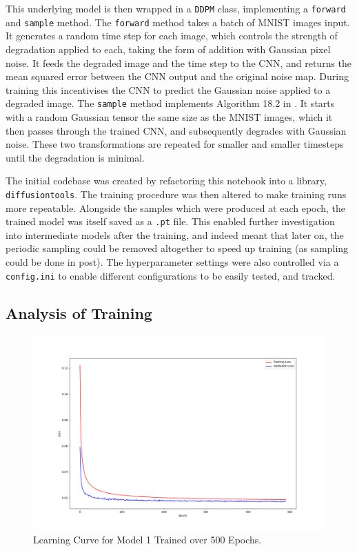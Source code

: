 \documentclass[12pt]{article}
\begin{document}
This underlying model is then wrapped in a \texttt{DDPM} class, implementing a \texttt{forward} and \texttt{sample} method.
The \texttt{forward} method takes a batch of MNIST images input.
It generates a random time step for each image, which controls the strength of degradation applied to each,
taking the form of addition with Gaussian pixel noise.
It feeds the degraded image and the time step to the CNN, and returns the mean squared error between the CNN output and the original noise map.
During training this incentivises the CNN to predict the Gaussian noise applied to a degraded image.
The \texttt{sample} method implements Algorithm 18.2 in \cite{prince2023understanding}.
It starts with a random Gaussian tensor the same size as the MNIST images, which it then passes through the trained CNN,
and subsequently degrades with Gaussian noise.
These two transformations are repeated for smaller and smaller timesteps until the degradation is minimal.

The initial codebase was created by refactoring this notebook into a library, \texttt{diffusiontools}.
The training procedure was then altered to make training runs more repeatable.
Alongside the samples which were produced at each epoch, the trained model was itself saved as a \texttt{.pt} file.
This enabled further investigation into intermediate models after the training, and indeed meant that later on,
the periodic sampling could be removed altogether to speed up training (as sampling could be done in post).
The hyperparameter settings were also controlled via a \texttt{config.ini} to enable different configurations to be easily tested, and tracked.

\subsection{Analysis of Training}

\begin{figure}[hp]
    \includegraphics[scale=0.35]{figures/learning_curve_1.png}
    \caption{Learning Curve for Model 1 Trained over 500 Epochs.}
    \label{fig:learning_curve_1}
\end{figure}
\end{document}
